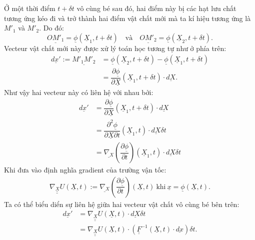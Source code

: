 \documentclass[../../../main.tex]{subfiles}
\begin{document}
    Ở một thời điểm $t+\delta t$ vô cùng bé sau đó, hai điểm này bị các hạt lưu chất tương ứng kéo đi và trở thành hai điểm vật chất mới mà ta kí hiệu tương ứng là $M'_1$ và $M'_2$. Do đó:
    	\[
			\underline{OM'_1}=\underline{\phi}\left(\underline{X}_1,t+\delta t\right)\quad\text{và}\quad\underline{OM'_2}=\underline{\phi}\left(\underline{X}_2,t+\delta t\right).
    	\]
    Vecteur vật chất mới này được xử lý toán học tương tự như ở phía trên:
		\[
			\begin{aligned}
				\underline{dx'}:=\underline{M'_1M'_2}&=\underline{\phi}\left(\underline{X}_2,t+\delta t\right)-\underline{\phi}\left(\underline{X}_1,t+\delta t\right)\\
				&=\dfrac{\partial\underline{\phi}}{\partial\underline{X}}\left(\underline{X}_1,t+\delta t\right)\cdot\underline{dX}.
			\end{aligned}
		\]
	Như vậy hai vecteur này có liên hệ với nhau bởi:
		\[
			\begin{aligned}			
				\underline{dx'}&=\dfrac{\partial\underline{\phi}}{\partial\underline{X}}\left(\underline{X}_1,t+\delta t\right)\cdot\underline{dX}\\
				&=\dfrac{\partial^2\underline{\phi}}{\partial\underline{X}\partial t}\left(\underline{X}_1,t\right)\cdot\underline{dX}\delta t\\
				&=\underline{\nabla_X}\left(\dfrac{\partial\underline{\phi}}{\partial t}\right)\left(\underline{X}_1,t\right)\cdot\underline{dX}\delta t
			\end{aligned}
		\]
	Khi đưa vào định nghĩa gradient của trường vận tốc:
			\begin{align}
				\boxed{\underline{\underline{\nabla_X U}}\left(\underline{X},t\right):=\underline{\nabla_X}\left(\dfrac{\partial\underline{\phi}}{\partial t}\right)\left(\underline{X},t\right)}\ \text{khi}\ \underline{x}=\underline{\phi}\left(\underline{X},t\right).
			\end{align}
	Ta có thể biểu diển sự liên hệ giữa hai vecteur vật chất vô cùng bé bên trên:
		\[
			\begin{aligned}
				\underline{dx'}&=\underline{\underline{\nabla_X U}}\left(\underline{X},t\right)\cdot\underline{dX}\delta t\\
				&=\underline{\underline{\nabla_X U}}\left(\underline{X},t\right)\cdot\left(\underline{\underline{F}}^{-1}\left(\underline{X},t\right)\cdot\underline{dx}\right)\delta t.
			\end{aligned}
		\]
\end{document}

